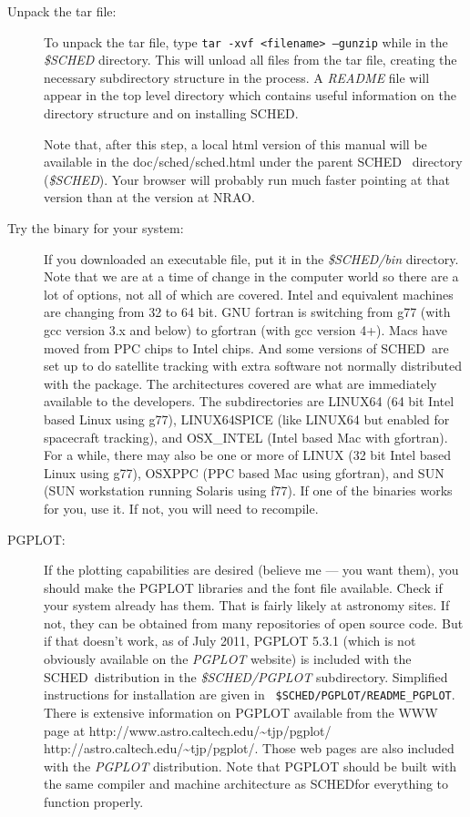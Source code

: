 \documentclass{report}
\newcommand{\sched}{{\sc SCHED}}
\newcommand{\schedb}{{\sc SCHED~}}
\begin{document}
\begin{description}
\item [Unpack the tar file:] To unpack the tar file, type {\tt tar
-xvf <filename> --gunzip} while in the {\sl \$SCHED} directory.  This
will unload all files from the tar file, creating the necessary
subdirectory structure in the process.  A {\sl README} file will
appear in the top level directory which contains useful information on
the directory structure and on installing \sched.

Note that, after this step, a local html version of this manual will
be available in the doc/sched/sched.html under the parent \schedb
directory ({\sl \$SCHED}).  Your browser will probably run much faster
pointing at that version than at the version at NRAO.

\item [Try the binary for your system:] If you downloaded an
executable file, put it in the {\sl \$SCHED/bin} directory.  Note that
we are at a time of change in the computer world so there are a lot of
options, not all of which are covered.  Intel and equivalent machines
are changing from 32 to 64 bit.  GNU fortran is switching from g77
(with gcc version 3.x and below) to gfortran (with gcc version 4+).
Macs have moved from PPC chips to Intel chips.  And some versions of
\schedb are set up to do satellite tracking with extra software not
normally distributed with the package.  The architectures covered are
what are immediately available to the developers.  The subdirectories
are LINUX64 (64 bit Intel based Linux using g77), LINUX64SPICE (like
LINUX64 but enabled for spacecraft tracking), and OSX\_INTEL (Intel
based Mac with gfortran).  For a while, there may also be one or more
of LINUX (32 bit Intel based Linux using g77), OSXPPC (PPC based Mac
using gfortran), and SUN (SUN workstation running Solaris using f77).
If one of the binaries works for you, use it.  If not, you will need
to recompile.

\item [{\sc PGPLOT:}] If the plotting capabilities are desired
(believe me --- you want them), you should make the {\sc PGPLOT}
libraries and the font file available.  Check if your system already
has them.  That is fairly likely at astronomy sites.  If not, they can
be obtained from many repositories of open source code.  But if that
doesn't work, as of July 2011, {\sc PGPLOT 5.3.1} (which is not
obviously available on the {\sl PGPLOT} website) is included with
the \schedb distribution in the {\sl \$SCHED/PGPLOT} subdirectory.
Simplified instructions for installation are given in {\tt
\$SCHED/PGPLOT/README\_PGPLOT}.  There is extensive information on {\sc
PGPLOT} available from the WWW page at \htmladdnormallink
{http://www.astro.caltech.edu/\~{}tjp/pgplot/}
{http://astro.caltech.edu/\~{}tjp/pgplot/}.  Those web pages are also
included with the {\sl PGPLOT} distribution.  Note that {\sc PGPLOT}
should be built with the same compiler and machine architecture as
\sched for everything to function properly.


\end{description}
\end{document}
